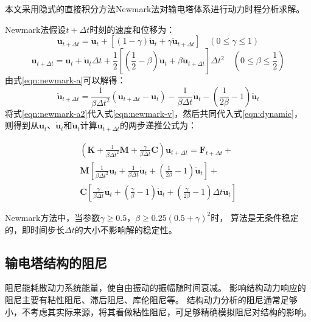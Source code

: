 本文采用隐式的直接积分方法Newmark法对输电塔体系进行动力时程分析求解。

Newmark法假设$t+\Delta t$时刻的速度和位移为：
\begin{equation}\label{eqn:newmark-v}
  \dot{\bm{u}}_{t+\Delta t}=\dot{\bm{u}}_{t}+\left[(1-\gamma)\ddot{\bm{u}}_t+\gamma \ddot{\bm{u}}_{t+\Delta t}\right] \quad(0 \leq \gamma \leq 1)
\end{equation}
\begin{equation}\label{eqn:newmark-a}
  \bm{u}_{t+\Delta t}=\bm{u}_t + \dot{\bm{u}}_{t} \Delta t+\frac{1}{2}\left[\left(\frac{1}{2}-\beta\right)\ddot{\bm{u}}_{t}+\beta\ddot{\bm{u}}_{t+\Delta t}\right] \Delta t^2 \quad \left(0 \leq \beta \leq \frac{1}{2}\right)
\end{equation}
由式\eqref{eqn:newmark-a}可以解得：
\begin{equation}\label{eqn:newmark-a2}
  \ddot{\bm{u}}_{t+\Delta t}=\frac{1}{\beta \Delta t^2} \left(\bm{u}_{t+\Delta t}-\bm{u}_{t}\right)-\frac{1}{\beta \Delta t} \dot{\bm{u}}_t - \left(\frac{1}{2\beta}-1\right) \ddot{\bm{u}}_t
\end{equation}
将式\eqref{eqn:newmark-a2}代入式\eqref{eqn:newmark-v}，然后共同代入式\eqref{eqn:dynamic}，
则得到从$\bm{u}_t$、$\dot{\bm{u}}_t$和$\ddot{\bm{u}}_t$计算$\bm{u}_{t+\Delta t}$的两步递推公式为：

\begin{equation}
\begin{split}
  \left(\bm{K}+\frac{1}{\beta \Delta t^2} \bm{M} + \frac{\gamma}{\beta \Delta t} \bm{C} \right) \bm{u}_{t+\Delta t} = \bm{F}_{t+\Delta t} + \\
  \bm{M} \left[ \frac{1}{\beta \Delta t^2} \bm{u}_t + \frac{1}{\beta \Delta t} \dot{\bm{u}}_t + \left(\frac{1}{2\beta} - 1 \right)\ddot{\bm{u}}_t\right] + \\
  \bm{C} \left[ \frac{\gamma}{\beta \Delta t} \bm{u}_t + \left(\frac{\gamma}{\beta} - 1 \right) \dot{\bm{u}}_t + \left(\frac{\gamma}{2\beta} - 1 \right) \Delta t \ddot{\bm{u}}_t\right]
\end{split}
\end{equation}

Newmark方法中，当参数$\gamma\geq 0.5$，$\beta \geq 0.25\left(0.5 + \gamma\right)^2$时，
算法是无条件稳定的，即时间步长$\Delta t$的大小不影响解的稳定性。

\subsection{输电塔结构的阻尼}
阻尼能耗散动力系统能量，使自由振动的振幅随时间衰减。
影响结构动力响应的阻尼主要有粘性阻尼、滞后阻尼、库伦阻尼等\cite{chopra2007dynamic}。
结构动力分析的阻尼通常足够小，不考虑其实际来源，将其看做粘性阻尼，可足够精确模拟阻尼对结构的影响。

